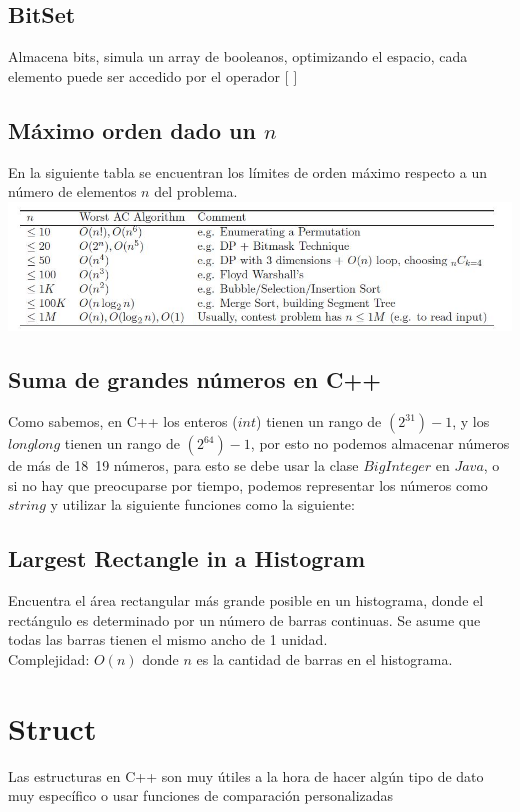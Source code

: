 \documentclass[10pt,letterpaper,twocolumn]{article}
\newcommand{\source}[1]{
  
  \dotfill
}
\begin{document}
  \subsection{BitSet}
    Almacena bits, simula un array de booleanos, optimizando el espacio, cada elemento puede ser accedido por el operador $[$ $]$\\
    \source{./src/bitset.cpp}
  \subsection{Máximo orden dado un $n$}
    En la siguiente tabla se encuentran los límites de orden máximo respecto a un número de elementos $n$ del problema.\\
    \includegraphics[scale=0.5]{./src/maxorder.jpg}
  \subsection{Suma de grandes números en C++}
    Como sabemos, en C++ los enteros ($int$) tienen un rango de $(2^31)-1$, y los $long long$ tienen un rango de $(2^64)-1$, por esto no podemos almacenar números de más de 18~19 números, para esto se debe usar la clase $BigInteger$ en $Java$, o si no hay que preocuparse por tiempo, podemos representar los números como $string$ y utilizar la siguiente funciones como la siguiente:
    \source{./src/bigIntegerCpp.cpp}
  \subsection{Largest Rectangle in a Histogram}
    Encuentra el área rectangular más grande posible en un histograma, donde el rectángulo es determinado por un número de barras continuas. Se asume que todas las barras tienen el mismo ancho de 1 unidad. \\
    Complejidad: $O(n)$ donde $n$ es la cantidad de barras en el histograma.
    \source{./src/largest_rectangle.cpp}

\section{Struct}
  Las estructuras en C++ son muy útiles a la hora de hacer algún tipo de dato muy específico o usar funciones de comparación personalizadas
\end{document}
